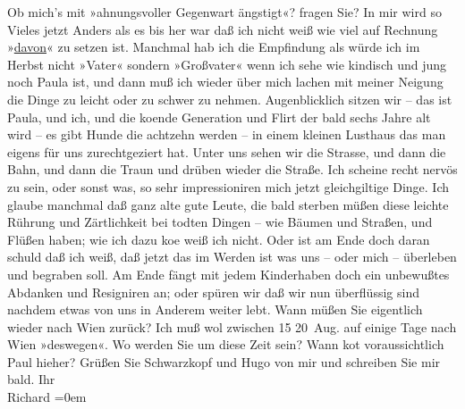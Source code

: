 \begin{ledgroupsized}[t]{13cm}
           \pstart
           Ob mich’s mit »ahnungsvoller
                  Gegenwart ängstigt«? fragen Sie? In mir wird so Vieles jetzt Anders als es
               bis her war daß ich nicht weiß wie viel auf Rech{\pb}nung »\uline{davon}« zu setzen ist. Manchmal hab ich die Empfindung als würde ich im
               Herbst nicht »Vater« sondern »Großvater« wenn ich sehe wie kindisch und jung noch Paula ist, und dann muß ich wieder {\pb}über mich lachen mit meiner Neigung
               die Dinge zu leicht oder zu schwer zu nehmen. Augenblicklich sitzen wir – das ist Paula, und ich, und die ko{\geminationm}ende
                  Generation und Flirt der bald sechs Jahre {\pb}alt wird – es gibt Hunde die
               achtzehn werden – in einem kleinen Lusthaus das man eigens für uns zurechtgezi{\geminationm}ert hat. Unter uns sehen wir die Strasse, und dann die
               Bahn, und dann die Traun und drüben wieder die
               Straße.\pend
           \pstart
           Ich scheine recht nervös {\pb}zu sein,
               oder sonst was, so sehr impressioniren mich jetzt gleichgiltige Dinge. Ich glaube
               manchmal daß ganz alte gute Leute, die bald sterben müßen diese leichte Rührung und
               Zärtlichkeit bei todten Dingen – wie Bäumen und {\pb}Straßen, und Flüßen haben; wie ich
               dazu ko{\geminationm}e weiß ich nicht. Oder ist am Ende doch daran
               schuld daß ich weiß, daß jetzt das im Werden ist was uns – oder mich – überleben und
               begraben soll. {\pb}Am Ende fängt mit
               jedem Kinderhaben doch ein unbewußtes Abdanken und Resigniren an; oder spüren wir daß
               wir nun überflüssig sind nachdem etwas von uns in {\pb}Anderem weiter lebt.\pend
           \pstart
           Wann müßen Sie eigentlich wieder nach Wien zurück?
               Ich muß wol zwischen 15{ }{\kaufmannsund}{ }20 Aug. auf einige Tage nach Wien
               »deswegen«. Wo werden Sie um diese Zeit sein? Wann ko{\geminationm}t
               voraussichtlich Paul hieher? Grüßen {\pb}Sie Schwarzkopf und Hugo von mir und schreiben Sie mir bald.\pend
           \pstart
           Ihr{\\[\baselineskip]}\spacefill\mbox{Richard}\pend
           \leftskip=0em{}
         

\end{ledgroupsized}

